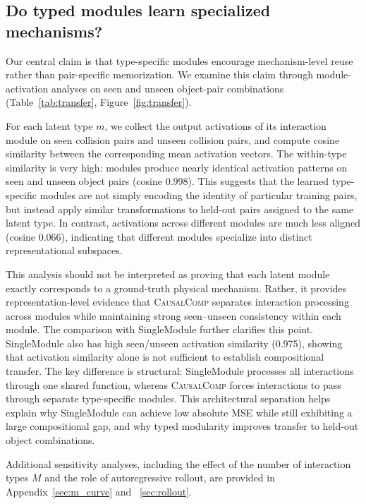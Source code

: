 \documentclass{article}
\newcommand{\ours}{\textsc{CausalComp}}
\begin{document}
\subsection{Do typed modules learn specialized mechanisms?}
\label{sec:transfer}

Our central claim is that type-specific modules encourage mechanism-level reuse rather than pair-specific memorization. We examine this claim through module-activation analyses on seen and unseen object-pair combinations (Table~\ref{tab:transfer}, Figure~\ref{fig:transfer}).

For each latent type $m$, we collect the output activations of its interaction module on seen collision pairs and unseen collision pairs, and compute cosine similarity between the corresponding mean activation vectors. The within-type similarity is very high: modules produce nearly identical activation patterns on seen and unseen object pairs (cosine 0.998). This suggests that the learned type-specific modules are not simply encoding the identity of particular training pairs, but instead apply similar transformations to held-out pairs assigned to the same latent type. In contrast, activations across different modules are much less aligned (cosine 0.066), indicating that different modules specialize into distinct representational subspaces.

This analysis should not be interpreted as proving that each latent module exactly corresponds to a ground-truth physical mechanism. Rather, it provides representation-level evidence that \ours{} separates interaction processing across modules while maintaining strong seen--unseen consistency within each module. The comparison with SingleModule further clarifies this point. SingleModule also has high seen/unseen activation similarity (0.975), showing that activation similarity alone is not sufficient to establish compositional transfer. The key difference is structural: SingleModule processes all interactions through one shared function, whereas \ours{} forces interactions to pass through separate type-specific modules. This architectural separation helps explain why SingleModule can achieve low absolute MSE while still exhibiting a large compositional gap, and why typed modularity improves transfer to held-out object combinations.

Additional sensitivity analyses, including the effect of the number of interaction types $M$ and the role of autoregressive rollout, are provided in Appendix~\ref{sec:m_curve} and ~\ref{sec:rollout}. 
\end{document}
